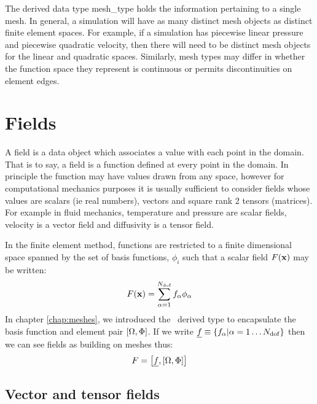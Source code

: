 \documentclass[a4paper, 11pt]{book}
\begin{document}
The derived data type mesh\_type holds the information pertaining to a
single mesh. In general, a simulation will have as many distinct mesh
objects as distinct finite element spaces. For example, if a simulation has
piecewise linear pressure and piecewise quadratic velocity, then there will
need to be distinct mesh objects for the linear and quadratic
spaces. Similarly, mesh types may differ in whether the function space they
represent is continuous or permits discontinuities on element edges.


\chapter{Fields}

A field is a data object which associates a value with each point in the
domain. That is to say, a field is a function defined at every point in the
domain. In principle the function may have values drawn from any space,
however for computational mechanics purposes it is usually sufficient to
consider fields whose values are scalars (ie real numbers), vectors and
square rank 2 tensors (matrices). For example in fluid mechanics,
temperature and pressure are scalar fields, velocity is a vector field and
diffusivity is a tensor field.

In the finite element method, functions are restricted to a
finite dimensional space spanned by the set of basis functions, $\phi_i$
such that a scalar field $F(\mathbf{x})$ may be written:
\begin{equation}
  F(\mathbf{x})=\sum_{\alpha=1}^{N_\mathrm{dof}} f_\alpha\phi_\alpha
\end{equation}
In chapter \ref{chap:meshes}, we introduced the \meshtype\ derived type to
encapsulate the basis function and element pair $[\Omega,\Phi]$. If we write
$\underline{f}\equiv \{f_\alpha|\alpha=1\ldots N_\mathrm{dof}\}$ then we can see fields as building on
meshes thus:
\begin{equation}\label{eq:scalarfield}
  F=\left[\underline{f},[\Omega,\Phi]\right]
\end{equation}

\section{Vector and tensor fields}\label{sec:vectorfields}
\end{document}

